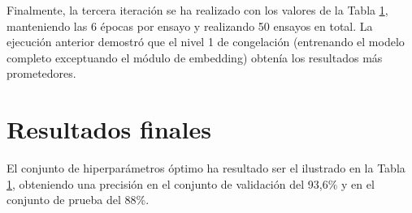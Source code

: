 Finalmente, la tercera iteración se ha realizado con los valores de la Tabla \ref{}, manteniendo las 6 épocas por ensayo y realizando 50 ensayos en total. La ejecución anterior demostró que el nivel 1 de congelación (entrenando el modelo completo exceptuando el módulo de embedding) obtenía los resultados más prometedores.


\section{Resultados finales}
El conjunto de hiperparámetros óptimo ha resultado ser el ilustrado en la Tabla \ref{}, obteniendo una precisión en el conjunto de validación del 93,6\% y en el conjunto de prueba del 88\%.  
